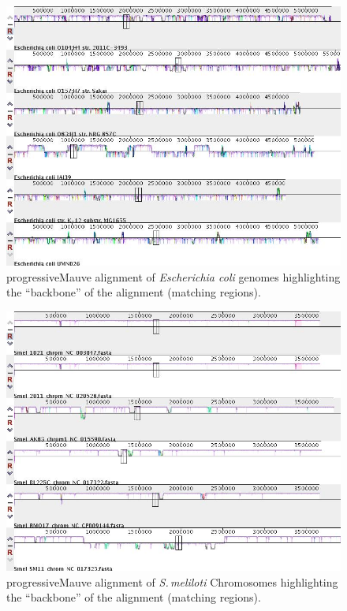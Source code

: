 \documentclass[12pt]{article}
\newcommand{\smel}{\textit{S.\,meliloti}\xspace}
\newcommand{\p}{progressiveMauve\xspace}
\newcommand{\ecoli}{\textit{Escherichia coli}\xspace}
\begin{document}
\newpage
\begin{figure}
	\includegraphics[width=0.9\linewidth]{./ecoli_Mauve_alignment_pic_26Mar20.jpg}
	\caption{\label{fig:ecoli_mauve}\p alignment of \ecoli genomes highlighting the ``backbone'' of the alignment (matching regions).}
\end{figure}

\begin{figure}
	\includegraphics[width=0.9\linewidth]{./sinoC_Mauve_alignment_pic_26Mar20.jpg}
	\caption{\label{fig:sinoC_mauve}\p alignment of \smel Chromosomes highlighting the ``backbone'' of the alignment (matching regions).}
\end{figure}
\end{document}
